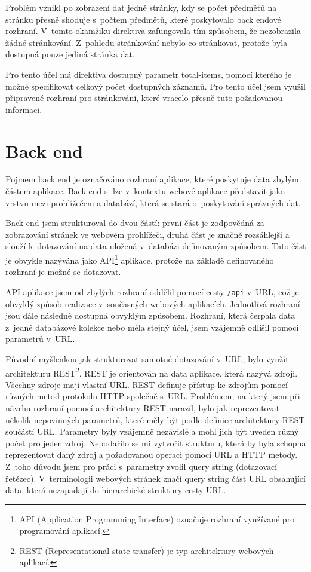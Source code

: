 \documentclass[thesis=M,czech]{FITthesis}[2012/06/26]
\begin{document}
      Problém vznikl po zobrazení dat jedné stránky, kdy se počet předmětů na stránku
      přesně shoduje s~počtem předmětů, které poskytovalo back endové rozhraní.
      V~tomto okamžiku direktiva zafungovala tím způsobem, že nezobrazila žádné stránkování.
      Z~pohledu stránkování nebylo co stránkovat, protože byla dostupná pouze jediná stránka dat.
      
      Pro tento účel má direktiva dostupný parametr total-items, pomocí kterého je
      možné specifikovat celkový počet dostupných záznamů.
      Pro tento účel jsem využil připravené rozhraní pro stránkování,
      které vracelo přesně tuto požadovanou informaci.

  \section{Back end}
  \label{backend}
  
    Pojmem back end je označováno rozhraní aplikace,
    které poskytuje data zbylým částem aplikace.
    Back end si lze v~kontextu webové aplikace představit jako
    vrstvu mezi prohlížečem a databází,
    která se stará o~poskytování správných dat.
    
    Back end jsem strukturoval do dvou částí:
    první část je zodpovědná za zobrazování stránek ve webovém prohlížeči,
    druhá část je značně rozsáhlejší a slouží k~dotazování na data uložená v~databázi definovaným způsobem.
    Tato část je obvykle nazývána jako API\footnote{
      API (Application Programming Interface) označuje rozhraní využívané pro programování aplikací.
    }
    aplikace, protože na základě definovaného rozhraní je možné se dotazovat.

    API aplikace jsem od zbylých rozhraní oddělil pomocí cesty \verb|/api| v~URL,
    což je obvyklý způsob realizace v~současných webových aplikacích.
    Jednotlivá rozhraní jsou dále následně dostupná obvyklým způsobem.
    Rozhraní, která čerpala data z~jedné databázové kolekce
    nebo měla stejný účel, jsem vzájemně odlišil pomocí parametrů v~URL.

    Původní myšlenkou jak strukturovat samotné dotazování v~URL, bylo využít architekturu REST\footnote{
      REST (Representational state transfer) je typ architektury webových aplikací.
    }.
    REST je orientován na data aplikace, která nazývá zdroji.
    Všechny zdroje mají vlastní URL.
    REST definuje přístup ke zdrojům pomocí různých metod protokolu HTTP společně s~URL.
    Problémem, na který jsem při návrhu rozhraní pomocí architektury REST narazil,
    bylo jak reprezentovat několik nepovinných parametrů, které měly být podle definice architektury REST součástí URL.
    Parametry byly vzájemně nezávislé a mohl jich být uveden různý počet pro jeden zdroj.
    Nepodařilo se mi vytvořit strukturu, která by byla schopna reprezentovat daný zdroj
    a požadovanou operaci pomocí URL a HTTP metody.
    Z~toho důvodu jsem pro práci s~parametry zvolil query string (dotazovací řetězec).
    V~terminologii webových stránek značí query string část URL obsahující data, která nezapadají do hierarchické struktury cesty URL.
\end{document}
